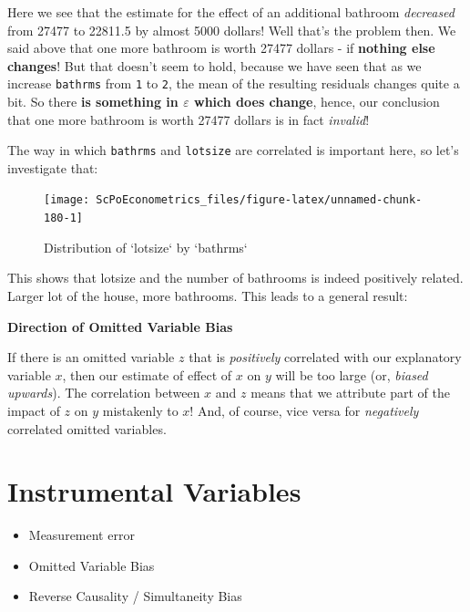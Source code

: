 \documentclass[]{book}
\providecommand{\tightlist}{%
  \setlength{\itemsep}{0pt}\setlength{\parskip}{0pt}}
\newenvironment{note}{\begin{tcolorbox}[colback=blue!5!white,colframe=blue!75!black]}{\end{tcolorbox}}
\begin{document}
Here we see that the estimate for the effect of an additional bathroom \emph{decreased} from 27477 to 22811.5 by almost 5000 dollars! Well that's the problem then. We said above that one more bathroom is worth 27477 dollars - if \textbf{nothing else changes}! But that doesn't seem to hold, because we have seen that as we increase \texttt{bathrms} from \texttt{1} to \texttt{2}, the mean of the resulting residuals changes quite a bit. So there \textbf{is something in \(\varepsilon\) which does change}, hence, our conclusion that one more bathroom is worth 27477 dollars is in fact \emph{invalid}!

The way in which \texttt{bathrms} and \texttt{lotsize} are correlated is important here, so let's investigate that:

\begin{figure}

{\centering \texttt{[image: ScPoEconometrics\_files/figure-latex/unnamed-chunk-180-1]} 

}

\caption{Distribution of `lotsize` by `bathrms`}\label{fig:unnamed-chunk-180}
\end{figure}

This shows that lotsize and the number of bathrooms is indeed positively related. Larger lot of the house, more bathrooms. This leads to a general result:

\begin{note}
\textbf{Direction of Omitted Variable Bias}

If there is an omitted variable \(z\) that is \emph{positively}
correlated with our explanatory variable \(x\), then our estimate of
effect of \(x\) on \(y\) will be too large (or, \emph{biased upwards}).
The correlation between \(x\) and \(z\) means that we attribute part of
the impact of \(z\) on \(y\) mistakenly to \(x\)! And, of course, vice
versa for \emph{negatively} correlated omitted variables.
\end{note}

\hypertarget{IV}{%
\chapter{Instrumental Variables}\label{IV}}

\begin{itemize}
\tightlist
\item
  Measurement error
\item
  Omitted Variable Bias
\item
  Reverse Causality / Simultaneity Bias
\end{itemize}
\end{document}
